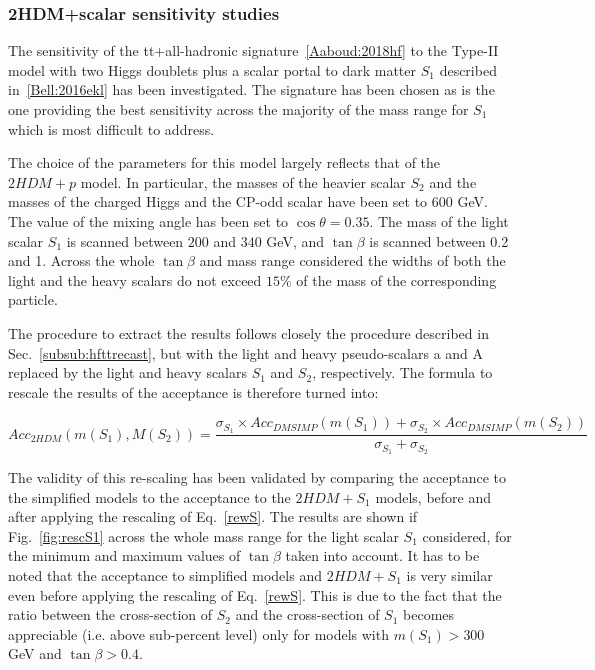 \subsubsection{2HDM+scalar sensitivity studies}

The sensitivity of the tt+\met all-hadronic signature~\ref{Aaboud:2018hf}
to the Type-II model with two Higgs doublets plus a 
scalar portal to dark matter $S_1$ described in~\ref{Bell:2016ekl} has been investigated.
The signature has been chosen as is the one providing the best sensitivity across the majority of the 
mass range for $S_1$ which is most difficult to address. 

The choice of the parameters for this model largely reflects that of the $2HDM+p$ model.
In particular, the masses of the heavier scalar $S_2$ and the masses of the charged Higgs and the CP-odd
scalar have been set to 600 GeV. The value of the mixing angle has been set to $\cos{\theta}=0.35$. 
The mass of the light scalar $S_1$ is scanned between $200$ and $340$ GeV, and $\tan\beta$ is scanned 
between 0.2 and 1. Across the whole $\tan\beta$ and mass range considered the widths of both the light and the heavy 
scalars do not exceed $15\%$ of the mass of the corresponding particle. 

The procedure to extract the results follows closely the procedure described in Sec.~\ref{subsub:hfttrecast}, 
but with the light and heavy pseudo-scalars a and A replaced by the light and heavy scalars
 $S_1$ and $S_2$, respectively.
The formula to rescale the results of the acceptance is therefore turned into:

\begin{equation}
Acc_{2HDM}(m(S_1),M(S_2))=\frac{\sigma_{S_1} \times Acc_{DMSIMP}(m(S_{1}))+
\sigma_{S_2} \times Acc_{DMSIMP}(m(S_{2}))}{\sigma_{S_1}+\sigma_{S_2}}
\label{rewS}
\end{equation}


The validity of this re-scaling has been validated by comparing the acceptance 
to the simplified models to the acceptance to the $2HDM+S_1$ models, before and 
after applying the rescaling of Eq.~\ref{rewS}. The results are shown if Fig.~\ref{fig:rescS1} across the whole
mass range for the light scalar $S_1$ considered, for the minimum and maximum values of 
$\tan\beta$ taken into account. 
It has to be noted that the acceptance to simplified models and $2HDM+S_1$ is very similar even 
before applying the rescaling of Eq.~\ref{rewS}.
This is due to the fact that the ratio between the cross-section of $S_2$ and the cross-section of $S_1$
becomes appreciable (i.e. above sub-percent level) only for models with $m(S_1)>300$ GeV
 and $\tan\beta > 0.4$.\\

